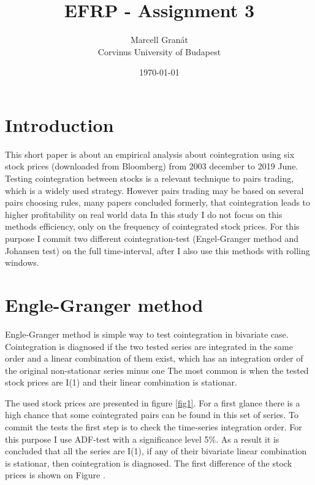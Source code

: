 \documentclass[12pt, a4paper, twoside, titlepage]{article}
\title{EFRP - Assignment 3}
\date{\today}
\author{Marcell Granát \\ Corvinus University of Budapest}
\begin{document}
  \maketitle
  \tableofcontents
  

\section*{Introduction}
\setcounter{page}{1}

This short paper is about an empirical analysis about cointegration using six stock prices (downloaded from Bloomberg) from 2003 december to 2019 June. Testing cointegration between stocks is a relevant technique to pairs trading, which is a widely used strategy. However pairs trading may be based on several pairs choosing rules, many papers concluded formerly, that cointegration leads to higher profitability on real world data
In this study I do not focus on this methods efficiency, only on the frequency of cointegrated stock prices. For this purpose I commit two different cointegration-test (Engel-Granger method and Johansen test) on the full time-interval, after I also use this methods with rolling windows.

\section*{Engle-Granger method}

Engle-Granger method is simple way to test cointegration in bivariate case. Cointegration is diagnosed if the two tested series are integrated in the same order and a linear combination of them exist, which has an integration order of the original non-stationar series minus one %
The most common is when the tested stock prices are I(1) and their linear combination is stationar.

The used stock prices are presented in figure \ref{fig1}. For a first glance there is a high chance that some cointegrated pairs can be found in this set of series. To commit the tests the first step is to check the time-series integration order. For this purpose I use ADF-test with a significance level 5\%. As a result it is concluded that all the series are I(1), if any of their bivariate linear combination is stationar, then cointegration is diagnosed. The first difference of the stock prices is shown on Figure \label{fig3}.
\end{document}

